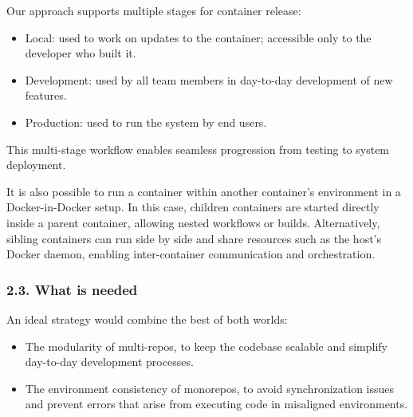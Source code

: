 \documentclass{article}
\begin{document}
Our approach supports multiple stages for container release:

\begin{itemize}

  \item Local: used to work on updates to the container; accessible only to the developer
    who built it.

  \item Development: used by all team members in day-to-day development of new
    features.

  \item Production: used to run the system by end users.
\end{itemize}

This multi-stage workflow enables seamless progression from testing to system
deployment.

It is also possible to run a container within another container's environment in
a Docker-in-Docker setup. In this case, children containers are started directly
inside a parent container, allowing nested workflows or builds. Alternatively, sibling
containers can run side by side and share resources such as the host's Docker daemon,
enabling inter-container communication and orchestration.

%


\subsubsection{2.3. What is needed}
\label{what-is-needed}

An ideal strategy would combine the best of both worlds:

\begin{itemize}

  \item The modularity of multi-repos, to keep the codebase scalable and
    simplify day-to-day development processes.

  \item The environment consistency of monorepos, to avoid synchronization
    issues and prevent errors that arise from executing code in misaligned
    environments.
\end{itemize}
\end{document}
